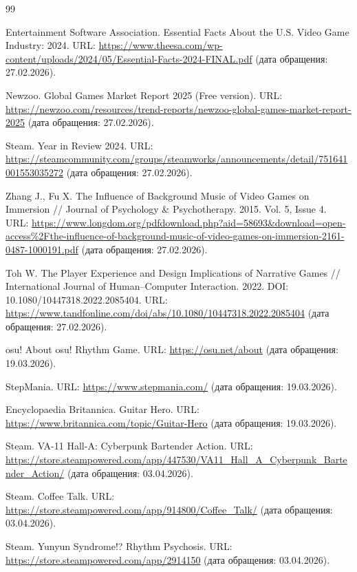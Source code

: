 \documentclass[utf8, russian]{eskdtext}
\numberwithin{equation}{section}
\newcounter{game_cnt}
\begin{document}
\begin{thebibliography}{99}

Entertainment Software Association. Essential Facts About the U.S. Video Game Industry: 2024. URL: \url{https://www.theesa.com/wp-content/uploads/2024/05/Essential-Facts-2024-FINAL.pdf} (дата обращения: 27.02.2026).

Newzoo. Global Games Market Report 2025 (Free version). URL: \url{https://newzoo.com/resources/trend-reports/newzoo-global-games-market-report-2025} (дата обращения: 27.02.2026).

Steam. Year in Review 2024. URL: \url{https://steamcommunity.com/groups/steamworks/announcements/detail/751641001553035272} (дата обращения: 27.02.2026).

Zhang J., Fu X. The Influence of Background Music of Video Games on Immersion // Journal of Psychology \& Psychotherapy. 2015. Vol. 5, Issue 4.  URL: \url{https://www.longdom.org/pdfdownload.php?aid=58693&download=open-access%2Fthe-influence-of-background-music-of-video-games-on-immersion-2161-0487-1000191.pdf} (дата обращения: 27.02.2026).

Toh W. The Player Experience and Design Implications of Narrative Games // International Journal of Human--Computer Interaction. 2022. DOI: 10.1080/10447318.2022.2085404. URL: \url{https://www.tandfonline.com/doi/abs/10.1080/10447318.2022.2085404} (дата обращения: 27.02.2026).

osu! About osu! Rhythm Game. URL: \url{https://osu.net/about} (дата обращения: 19.03.2026).

StepMania. URL: \url{https://www.stepmania.com/} (дата обращения: 19.03.2026).

Encyclopaedia Britannica. Guitar Hero. URL: \url{https://www.britannica.com/topic/Guitar-Hero} (дата обращения: 19.03.2026).

Steam. VA-11 Hall-A: Cyberpunk Bartender Action. URL: \url{https://store.steampowered.com/app/447530/VA11_Hall_A_Cyberpunk_Bartender_Action/} (дата обращения: 03.04.2026).

Steam. Coffee Talk. URL: \url{https://store.steampowered.com/app/914800/Coffee_Talk/} (дата обращения: 03.04.2026).

Steam. Yunyun Syndrome!? Rhythm Psychosis. URL: \url{https://store.steampowered.com/app/2914150} (дата обращения: 03.04.2026).


\end{thebibliography}
\end{document}
